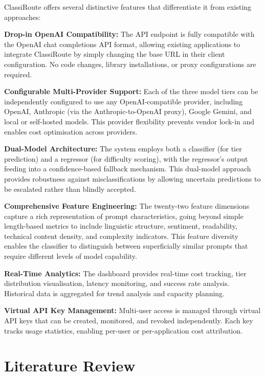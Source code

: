 \documentclass[oneside,12pt,a4paper]{report}
\begin{document}
ClassiRoute offers several distinctive features that differentiate it from existing approaches:

\textbf{Drop-in OpenAI Compatibility:} The API endpoint is fully compatible with the OpenAI chat completions API format, allowing existing applications to integrate ClassiRoute by simply changing the base URL in their client configuration. No code changes, library installations, or proxy configurations are required.

\textbf{Configurable Multi-Provider Support:} Each of the three model tiers can be independently configured to use any OpenAI-compatible provider, including OpenAI, Anthropic (via the Anthropic-to-OpenAI proxy), Google Gemini, and local or self-hosted models. This provider flexibility prevents vendor lock-in and enables cost optimisation across providers.

\textbf{Dual-Model Architecture:} The system employs both a classifier (for tier prediction) and a regressor (for difficulty scoring), with the regressor's output feeding into a confidence-based fallback mechanism. This dual-model approach provides robustness against misclassifications by allowing uncertain predictions to be escalated rather than blindly accepted.

\textbf{Comprehensive Feature Engineering:} The twenty-two feature dimensions capture a rich representation of prompt characteristics, going beyond simple length-based metrics to include linguistic structure, sentiment, readability, technical content density, and complexity indicators. This feature diversity enables the classifier to distinguish between superficially similar prompts that require different levels of model capability.

\textbf{Real-Time Analytics:} The dashboard provides real-time cost tracking, tier distribution visualisation, latency monitoring, and success rate analysis. Historical data is aggregated for trend analysis and capacity planning.

\textbf{Virtual API Key Management:} Multi-user access is managed through virtual API keys that can be created, monitored, and revoked independently. Each key tracks usage statistics, enabling per-user or per-application cost attribution.

\chapter{Literature Review}
\end{document}
